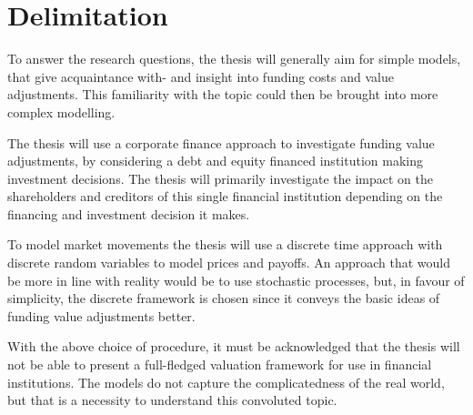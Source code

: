 \documentclass[main.tex]{subfiles}
\begin{document}
    \section{Delimitation}

    To answer the research questions, the thesis will generally aim for simple models,
    that give acquaintance with- and insight into funding costs and value adjustments.
    This familiarity with the topic could then be brought into more complex modelling.

    The thesis will use a corporate finance approach to investigate funding value adjustments,
    by considering a debt and equity financed institution making investment decisions.
    The thesis will primarily investigate the impact on the shareholders and creditors 
    of this single financial institution depending on the financing and investment decision it makes.

    To model market movements the thesis will use a discrete time approach 
    with discrete random variables to model prices and payoffs.
    An approach that would be more in line with reality would be to use stochastic processes,
    but, in favour of simplicity, the discrete framework is chosen 
    since it conveys the basic ideas of funding value adjustments better.

    With the above choice of procedure, it must be acknowledged that the thesis will not be able to
    present a full-fledged valuation framework for use in financial institutions.
    The models do not capture the complicatedness of the real world,
    but that is a necessity to understand this convoluted topic.
\end{document}
